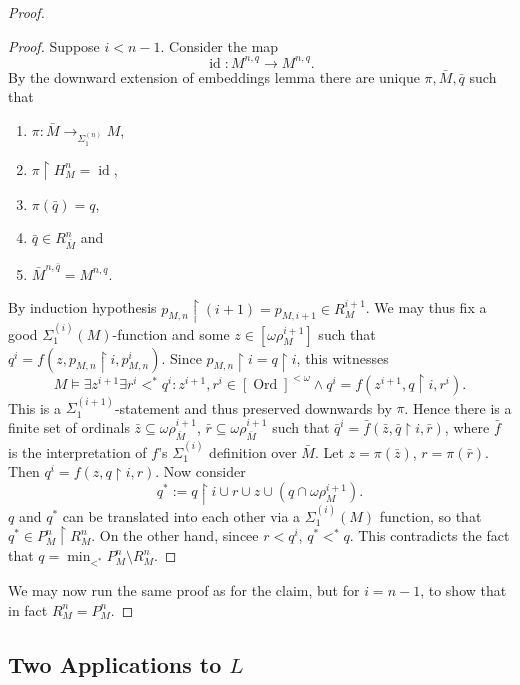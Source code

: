 \documentclass[12pt,a4paper]{article}
\theoremstyle{nicestyle}
\DeclareMathOperator{\ord}{Ord}
\DeclareMathOperator{\id}{id}
\begin{document}
\begin{proof}
    \begin{proof}
      Suppose $i < n-1$. Consider the map
      \[
	\id \colon M^{n, q} \to M^{n, q}.
      \]
      By the downward extension of embeddings lemma there are unique
      $\pi, \bar{M}, \bar{q}$ such that
      \begin{enumerate}
      \item $\pi \colon \bar{M} \to_{\Sigma^{(n)}_{1}} M$,
      \item $\pi \restriction H^{n}_{M} = \id$,
      \item $\pi(\bar{q}) = q$,
      \item $\bar{q} \in R^{n}_{\bar{M}}$ and
      \item $\bar{M}^{n, \bar{q}} = M^{n,q}$.
      \end{enumerate}
      By induction hypothesis
      $p_{M,n} \restriction (i+1) = p_{M, i+1} \in R^{i+1}_{M}$. We
      may thus fix a good $\Sigma^{(i)}_{1}(M)$-function and some
      $z \in [\omega\rho^{i+1}_{M}]$ such that
      $q^{i} = f(z, p_{M,n} \restriction i, p_{M,n}^{i})$. Since
      $p_{M,n} \restriction i = q \restriction i$, this witnesses
      \[
	M \models \exists z^{i+1} \exists r^{i} <^{*} q^{i} \colon
        z^{i+1}, r^{i} \in [\ord]^{<\omega} \wedge q^{i} = f(z^{i+1},
        q \restriction i, r^{i}).
      \]
      This is a $\Sigma^{(i+1)}_{1}$-statement and thus preserved
      downwards by $\pi$. Hence there is a finite set of ordinals
      $\bar{z} \subseteq \omega\rho^{i+1}_{\bar{M}}$,
      $\bar{r} \subseteq \omega\rho^{i+1}_{\bar{M}}$ such that
      $\bar{q}^{i} = \bar{f}(\bar{z}, \bar{q} \restriction i
      ,\bar{r})$, where $\bar{f}$ is the interpretation of $f$'s
      $\Sigma^{(i)}_{1}$ definition over $\bar{M}$.  Let
      $z = \pi(\bar{z})$, $r = \pi(\bar{r})$. Then
      $q^{i} = f(z, q \restriction i, r)$. Now consider
      \[
	q^{*} := q \restriction i \cup r \cup z \cup (q \cap
        \omega\rho^{i+1}_{M}).
      \]
      $q$ and $q^{*}$ can be translated into each other via a
      $\Sigma^{(i)}_{1}(M)$ function, so that
      $q^{*} \in P^{n}_{M} \restriction R^{n}_{M}$. On the other hand,
      sincee $r < q^{i}$, $q^{*} <^{*} q$. This contradicts the fact
      that $q = \min_{<^{*}} P^{n}_{M} \setminus R^{n}_{M}$.
    \end{proof}
    We may now run the same proof as for the claim, but for $i = n-1$,
    to show that in fact $R^{n}_{M} = P^{n}_{M}$.
  \end{proof}

  \subsection{Two Applications to $L$}
\end{document}
